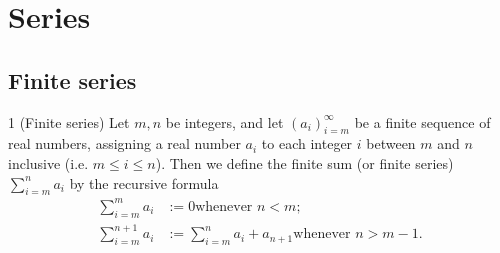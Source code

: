 \section{Series}\label{a1-ch7}
\subsection{Finite series}
\begin{definition}{1}
    \label{finite-series}
    (Finite series) Let $m, n$ be integers, and let $(a_i)_{i=m}^{\infty}$ be a
    finite sequence of real numbers, assigning a real number $a_i$ to each
    integer $i$ between $m$ and $n$ inclusive (i.e. $m \leq i \leq n$). Then
    we define the finite sum (or finite series) $\sum_{i=m}^{n} a_i$ by the
    recursive formula
    \begin{align*}
        \sum_{i=m}^{m} a_i &:= 0 \text{whenever $n < m$;} \\
        \sum_{i=m}^{n+1} a_i &:= \sum_{i=m}^{n} a_i + a_{n+1} \text{whenever $n > m - 1$.}
    \end{align*}
\end{definition}

